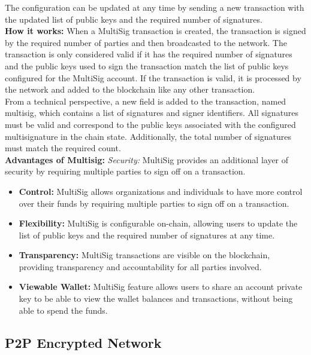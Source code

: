 \documentclass[12pt,a4paper,twocolumn]{article}
\begin{document}
The configuration can be updated at any time by sending a new transaction with the updated list of public keys and the required number of signatures.\\

\textbf{How it works:} When a MultiSig transaction is created, the transaction is signed by the required number of parties and then broadcasted to the network. The transaction is only considered valid if it has the required number of signatures and the public keys used to sign the transaction match the list of public keys configured for the MultiSig account. If the transaction is valid, it is processed by the network and added to the blockchain like any other transaction.\\

From a technical perspective, a new field is added to the transaction, named multisig, which contains a list of signatures and signer identifiers. All signatures must be valid and correspond to the public keys associated with the configured multisignature in the chain state. Additionally, the total number of signatures must match the required count.\\

\textbf{Advantages of Multisig:} \textit{Security:} MultiSig provides an additional layer of security by requiring multiple parties to sign off on a transaction. 
\begin{itemize}
\item \textbf{Control:} MultiSig allows organizations and individuals to have more control over their funds by requiring multiple parties to sign off on a transaction. 
\item \textbf{Flexibility:} MultiSig is configurable on-chain, allowing users to update the list of public keys and the required number of signatures at any time. 
\item \textbf{Transparency:} MultiSig transactions are visible on the blockchain, providing transparency and accountability for all parties involved. 
\item \textbf{Viewable Wallet:} MultiSig feature allows users to share an account private key to be able to view the wallet balances and transactions, without being able to spend the funds.\\
\end{itemize}
\subsection{P2P Encrypted Network}
\end{document}
